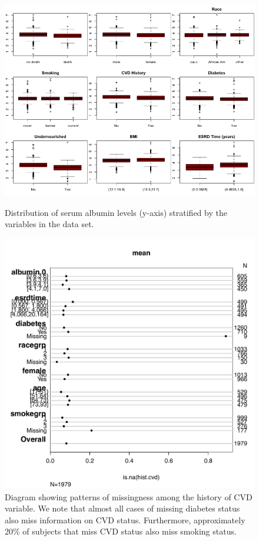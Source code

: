 \documentclass[paper=a4, fontsize=11pt]{scrartcl} %
\numberwithin{equation}{section} %
\numberwithin{figure}{section} %
\numberwithin{table}{section} %
\begin{document}
\begin{figure}[H]
\centering
\caption{Distribution of serum albumin levels (y-axis) stratified by the variables in the data set.}
\includegraphics[width=.8\textwidth]{plots/albumin_biv_box.png}
\label{fig:albumin_biv_box}
\end{figure}



\begin{figure}[H]
\centering
\includegraphics[width=.6\textwidth]{plots/hist_na.pdf}
\caption{Diagram showing patterns of missingness among the history of CVD variable. We note that almost all cases of missing diabetes status also miss information on CVD status. Furthermore, approximately 20\% of subjects that miss CVD status also miss smoking status.}
\label{fig:hist_na}
\end{figure}
\end{document}
